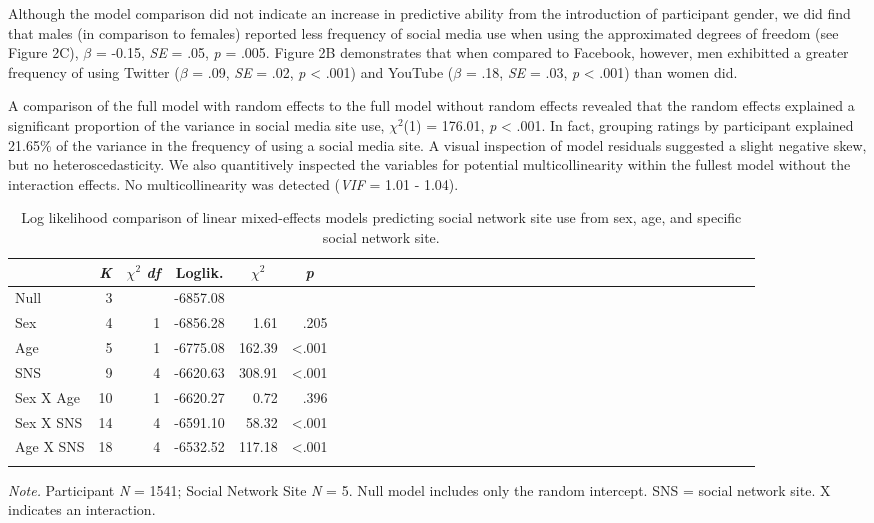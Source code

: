 \documentclass[man, fleqn, noextraspace]{apa6}
\theoremstyle{definition}
\theoremstyle{definition}
\theoremstyle{definition}
\theoremstyle{remark}
\begin{document}
Although the model comparison did not indicate an increase in predictive
ability from the introduction of participant gender, we did find that
males (in comparison to females) reported less frequency of social media
use when using the approximated degrees of freedom (see Figure 2C),
\(\beta\) = -0.15, \emph{SE} = .05, \emph{p} = .005. Figure 2B
demonstrates that when compared to Facebook, however, men exhibitted a
greater frequency of using Twitter (\(\beta\) = .09, \emph{SE} = .02,
\emph{p} \textless{} .001) and YouTube (\(\beta\) = .18, \emph{SE} =
.03, \emph{p} \textless{} .001) than women did.

A comparison of the full model with random effects to the full model
without random effects revealed that the random effects explained a
significant proportion of the variance in social media site use,
\(\chi^2\)(1) = 176.01, \emph{p} \textless{} .001. In fact, grouping
ratings by participant explained 21.65\% of the variance in the
frequency of using a social media site. A visual inspection of model
residuals suggested a slight negative skew, but no heteroscedasticity.
We also quantitively inspected the variables for potential
multicollinearity within the fullest model without the interaction
effects. No multicollinearity was detected (\emph{VIF} = 1.01 - 1.04).

\begin{table}[tbp]
\begin{center}
\begin{threeparttable}
\caption{\label{tab:df_lmer_table}Log likelihood comparison of linear mixed-effects models predicting social network site use from sex, age, and specific social network site.}
\begin{tabular}{lrrrrrlrrrrrlrrrrrlrrrrrlrrrrrlrrrrr}
\toprule
 & \multicolumn{1}{c}{\textit{K}} & \multicolumn{1}{c}{$\chi^2$ \textit{df}} & \multicolumn{1}{c}{Loglik.} & \multicolumn{1}{c}{$\chi^2$} & \multicolumn{1}{c}{\textit{p}}\\
\midrule
Null & 3 &  & -6857.08 &  & \\
Sex & 4 & 1 & -6856.28 & 1.61 & .205\\
Age & 5 & 1 & -6775.08 & 162.39 & <.001\\
SNS & 9 & 4 & -6620.63 & 308.91 & <.001\\
Sex X Age & 10 & 1 & -6620.27 & 0.72 & .396\\
Sex X SNS & 14 & 4 & -6591.10 & 58.32 & <.001\\
Age X SNS & 18 & 4 & -6532.52 & 117.18 & <.001\\
\bottomrule
\addlinespace
\end{tabular}
\begin{tablenotes}[para]
\normalsize{\textit{Note.} Participant \textit{N} = 1541; Social Network Site \textit{N} = 5. Null model includes only the random intercept. SNS = social network site. X indicates an interaction.}
\end{tablenotes}
\end{threeparttable}
\end{center}
\end{table}
\end{document}
